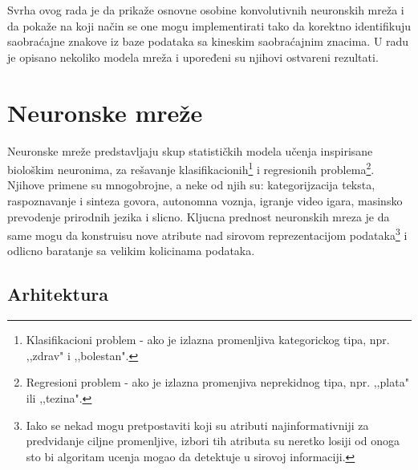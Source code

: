 \documentclass[a4paper]{article}
\begin{document}
Svrha ovog rada je da prikaže osnovne osobine konvolutivnih neuronskih mreža i da pokaže na koji način se one mogu implementirati tako da korektno identifikuju saobraćajne znakove iz baze podataka sa kineskim saobraćajnim znacima. U radu je opisano nekoliko modela mreža i upoređeni su njihovi ostvareni rezultati.



\newpage

\section{Neuronske mreže}
\label{sec:cnn}

Neuronske mreže predstavljaju skup statističkih modela učenja inspirisane biološkim neuronima, za rešavanje klasifikacionih\footnote{Klasifikacioni problem - ako je izlazna promenljiva kategorickog tipa, npr. ,,zdrav" i ,,bolestan".} i regresionih problema\footnote{Regresioni problem - ako je izlazna promenjiva neprekidnog tipa, npr. ,,plata" ili ,,tezina".}. Njihove primene su mnogobrojne, a neke od njih su: kategorijzacija teksta,
 raspoznavanje i sinteza govora, autonomna voznja, igranje video igara, masinsko prevodenje prirodnih jezika i slicno. Kljucna prednost neuronskih mreza je da same mogu da konstruisu nove atribute nad sirovom reprezentacijom podataka\footnote{Iako se nekad mogu pretpostaviti koji su atributi najinformativniji za predvidanje ciljne promenljive, izbori tih atributa su neretko losiji od onoga sto bi algoritam ucenja mogao da detektuje u sirovoj informaciji.} i odlicno baratanje sa velikim kolicinama podataka.


\subsection{Arhitektura}
\end{document}
